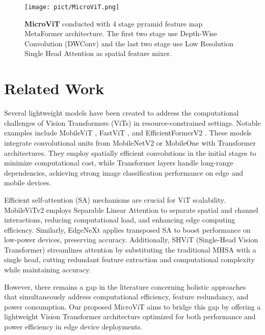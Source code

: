 \begin{figure*}
    \centering
    \texttt{[image: pict/MicroViT.png]}
    \caption{\textbf{MicroViT} conducted with 4 stage pyramid feature map MetaFormer architecture. The first two stage use Depth-Wise Convolution (DWConv) and the last two stage use Low Resolution Single Head Attention as spatial feature mixer.}
    \label{fig:MicroViT-Arch}
\end{figure*}
\section{Related Work}

Several lightweight models have been created to address the computational challenges of Vision Transformers (ViTs) in resource-constrained settings. Notable examples include MobileViT \cite{mehta2021mobilevit}, FastViT \cite{vasu2023fastvit}, and EfficientFormerV2 \cite{li2023rethinking}. These models integrate convolutional units from MobileNetV2 \cite{sandler2018mobilenetv2} or MobileOne \cite{vasu2023mobileone} with Transformer architectures. They employ spatially efficient convolutions in the initial stages to minimize computational cost, while Transformer layers handle long-range dependencies, achieving strong image classification performance on edge and mobile devices.

Efficient self-attention (SA) mechanisms are crucial for ViT scalability. MobileViTv2 \cite{mehta2022separable} employs Separable Linear Attention to separate spatial and channel interactions, reducing computational load, and enhancing edge computing efficiency. Similarly, EdgeNeXt \cite{maaz2022edgenext} applies transposed SA to boost performance on low-power devices, preserving accuracy. Additionally, SHViT (Single-Head Vision Transformer) \cite{yun2024shvit} streamlines attention by substituting the traditional MHSA with a single head, cutting redundant feature extraction and computational complexity while maintaining accuracy.

However, there remains a gap in the literature concerning holistic approaches that simultaneously address computational efficiency, feature redundancy, and power consumption. Our proposed MicroViT aims to bridge this gap by offering a lightweight Vision Transformer architecture optimized for both
performance and power efficiency in edge device deployments.